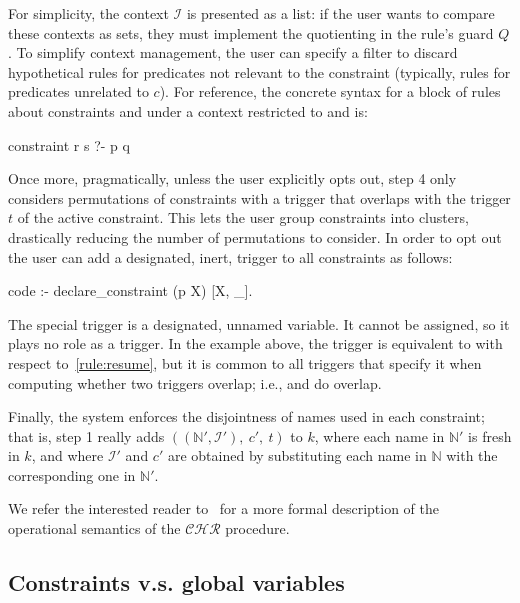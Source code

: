 \documentclass{these-ISSS}
\newenvironment{elpicode}
  {\VerbatimEnvironment\begin{elpibox}\begin{xelpicode}}{\end{xelpicode}
\end{elpibox}}
\begin{document}
For simplicity, the context $\mathcal{I}$ is presented as a list: if the user
wants to compare these contexts as sets, they must implement the quotienting
in the rule's guard $Q$. To simplify context management, the user can specify a
filter to discard hypothetical rules for predicates not relevant to the constraint
(typically, rules for predicates unrelated to $c$). For reference, the concrete
syntax for a block of rules about constraints  and  under a
context restricted to  and  is:

\begin{elpicode}
constraint r s ?- p q {
}
\end{elpicode}
\noindent
Once more, pragmatically, unless the user explicitly opts out, step 4 only
considers permutations of constraints with a trigger that overlaps with the
trigger $t$ of the active constraint.
This lets the user group constraints into clusters,
drastically reducing the number of permutations
to consider. In order to opt out the user can add a designated, inert,
trigger to all constraints as follows:
\begin{elpicode}
code :- declare_constraint (p X) [X, _].
\end{elpicode}
The special trigger \elpi{_} is a designated, unnamed variable. It cannot be
assigned, so it plays no role as a trigger. In the example above, the trigger
\elpi{[X, _]} is equivalent to \elpi{[X]} with respect to~\ref{rule:resume},
but it is common to all triggers that specify it when computing whether two
triggers overlap; i.e., \elpi{[X, _]} and \elpi{[Y, _]} do overlap.

Finally, the system enforces the disjointness of names used in each constraint;
that is, step 1 really adds $((\mathbb{N'},\mathcal{I'}),\ c',\ t)$ to $k$,
where each name in $\mathbb{N'}$ is fresh in $k$, and where $\mathcal{I'}$ and
$c'$ are obtained by substituting each name in $\mathbb{N}$ with the
corresponding one in $\mathbb{N'}$.

We refer the interested reader to~\cite{TASSI_2019} for a more formal
description of the operational semantics of the $\mathcal{CHR}$ procedure.

\subsection{Constraints v.s. global variables}
\end{document}
